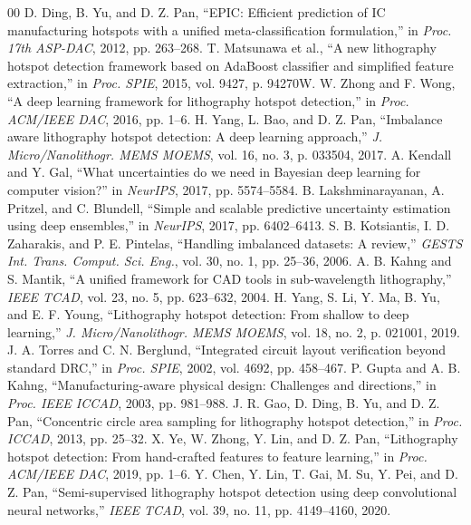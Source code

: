\documentclass[11pt,journal,onecolumn]{IEEEtran}
\begin{document}
\begin{thebibliography}{00}
 D. Ding, B. Yu, and D. Z. Pan, ``EPIC: Efficient prediction of IC manufacturing hotspots with a unified meta-classification formulation,'' in \textit{Proc. 17th ASP-DAC}, 2012, pp. 263--268.
 T. Matsunawa et al., ``A new lithography hotspot detection framework based on AdaBoost classifier and simplified feature extraction,'' in \textit{Proc. SPIE}, 2015, vol. 9427, p. 94270W.
 W. Zhong and F. Wong, ``A deep learning framework for lithography hotspot detection,'' in \textit{Proc. ACM/IEEE DAC}, 2016, pp. 1--6.
 H. Yang, L. Bao, and D. Z. Pan, ``Imbalance aware lithography hotspot detection: A deep learning approach,'' \textit{J. Micro/Nanolithogr. MEMS MOEMS}, vol. 16, no. 3, p. 033504, 2017.
 A. Kendall and Y. Gal, ``What uncertainties do we need in Bayesian deep learning for computer vision?'' in \textit{NeurIPS}, 2017, pp. 5574--5584.
 B. Lakshminarayanan, A. Pritzel, and C. Blundell, ``Simple and scalable predictive uncertainty estimation using deep ensembles,'' in \textit{NeurIPS}, 2017, pp. 6402--6413.
 S. B. Kotsiantis, I. D. Zaharakis, and P. E. Pintelas, ``Handling imbalanced datasets: A review,'' \textit{GESTS Int. Trans. Comput. Sci. Eng.}, vol. 30, no. 1, pp. 25--36, 2006.
 A. B. Kahng and S. Mantik, ``A unified framework for CAD tools in sub-wavelength lithography,'' \textit{IEEE TCAD}, vol. 23, no. 5, pp. 623--632, 2004.
 H. Yang, S. Li, Y. Ma, B. Yu, and E. F. Young, ``Lithography hotspot detection: From shallow to deep learning,'' \textit{J. Micro/Nanolithogr. MEMS MOEMS}, vol. 18, no. 2, p. 021001, 2019.
 J. A. Torres and C. N. Berglund, ``Integrated circuit layout verification beyond standard DRC,'' in \textit{Proc. SPIE}, 2002, vol. 4692, pp. 458--467.
 P. Gupta and A. B. Kahng, ``Manufacturing-aware physical design: Challenges and directions,'' in \textit{Proc. IEEE ICCAD}, 2003, pp. 981--988.
 J. R. Gao, D. Ding, B. Yu, and D. Z. Pan, ``Concentric circle area sampling for lithography hotspot detection,'' in \textit{Proc. ICCAD}, 2013, pp. 25--32.
 X. Ye, W. Zhong, Y. Lin, and D. Z. Pan, ``Lithography hotspot detection: From hand-crafted features to feature learning,'' in \textit{Proc. ACM/IEEE DAC}, 2019, pp. 1--6.
 Y. Chen, Y. Lin, T. Gai, M. Su, Y. Pei, and D. Z. Pan, ``Semi-supervised lithography hotspot detection using deep convolutional neural networks,'' \textit{IEEE TCAD}, vol. 39, no. 11, pp. 4149--4160, 2020.

\end{thebibliography}
\end{document}
